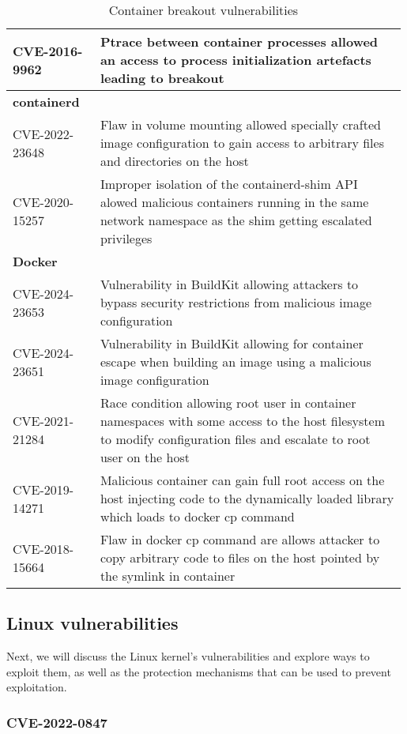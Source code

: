 \begin{table}[hbt]
\begin{tabular}{| p{0.22\linewidth} | p{0.77\linewidth} |}
        CVE-2016-9962 & Ptrace between container processes allowed an access to process initialization artefacts leading to breakout \\ \hline
        \multicolumn{2}{|l|}{\textbf{containerd}} \\ \hline
        CVE-2022-23648 & Flaw in volume mounting allowed specially crafted image configuration to gain access to arbitrary files and directories on the host \\ \hline
        CVE-2020-15257 & Improper isolation of the containerd-shim API alowed malicious containers running in the same network namespace as the shim getting escalated privileges \\ \hline
        \multicolumn{2}{|l|}{\textbf{Docker}} \\ \hline
        CVE-2024-23653 & Vulnerability in BuildKit allowing attackers to bypass security restrictions from malicious image configuration \\ \hline
        CVE-2024-23651 & Vulnerability in BuildKit allowing for container escape when building an image using a malicious image configuration \\ \hline
        CVE-2021-21284 & Race condition allowing root user in container namespaces with some access to the host filesystem to modify configuration files and escalate to root user on the host \\ \hline
        CVE-2019-14271 & Malicious container can gain full root access on the host injecting code to the dynamically loaded library which loads to docker cp command \\ \hline
        CVE-2018-15664 & Flaw in docker cp command are allows attacker to copy arbitrary code to files on the host pointed by the symlink in container \\ \hline
    \end{tabular}
    \caption{Container breakout vulnerabilities}
    \label{tab:escapecve}
\end{table}

\FloatBarrier
\clearpage


\subsection{Linux vulnerabilities}
Next, we will discuss the Linux kernel's vulnerabilities and explore ways to exploit them, as well as the protection mechanisms that can be used to prevent exploitation.

\subsubsection{CVE-2022-0847}

